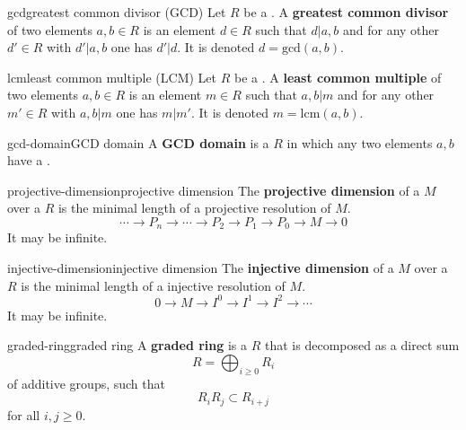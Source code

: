 \begin{topic}{gcd}{greatest common divisor (GCD)}
    Let $R$ be a . A \textbf{greatest common divisor} of two elements $a, b \in R$ is an element $d \in R$ such that $d | a, b$ and for any other $d' \in R$ with $d' | a, b$ one has $d' | d$. It is denoted $d = \text{gcd}(a, b)$.
\end{topic}

\begin{topic}{lcm}{least common multiple (LCM)}
    Let $R$ be a . A \textbf{least common multiple} of two elements $a, b \in R$ is an element $m \in R$ such that $a, b | m$ and for any other $m' \in R$ with $a, b | m$ one has $m | m'$. It is denoted $m = \text{lcm}(a, b)$.
\end{topic}

\begin{topic}{gcd-domain}{GCD domain}
    A \textbf{GCD domain} is a  $R$ in which any two elements $a, b$ have a .
\end{topic}

\begin{topic}{projective-dimension}{projective dimension}
    The \textbf{projective dimension} of a  $M$ over a  $R$ is the minimal length of a projective resolution of $M$.
    \[ \cdots \to P_n \to \cdots \to P_2 \to P_1 \to P_0 \to M \to 0 \]
    It may be infinite.
\end{topic}

\begin{topic}{injective-dimension}{injective dimension}
    The \textbf{injective dimension} of a  $M$ over a  $R$ is the minimal length of a injective resolution of $M$.
    \[ 0 \to M \to I^0 \to I^1 \to I^2 \to \cdots \]
    It may be infinite.
\end{topic}


\begin{topic}{graded-ring}{graded ring}
    A \textbf{graded ring} is a  $R$ that is decomposed as a direct sum
    \[ R = \bigoplus_{i \ge 0} R_i \]
    of additive groups, such that
    \[ R_i R_j \subset R_{i + j} \]
    for all $i, j \ge 0$.
\end{topic}

